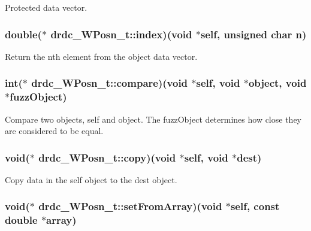 Protected data vector. 

\hypertarget{structdrdc__WPosn__t_fe7d9231dfd6645858e0427d49c78e2b}{
\subsubsection[index]{\setlength{\rightskip}{0pt plus 5cm}double($\ast$ {\bf drdc\_\-WPosn\_\-t::index})(void $\ast$self, unsigned char n)}}
\label{structdrdc__WPosn__t_fe7d9231dfd6645858e0427d49c78e2b}


Return the nth element from the object data vector. 

\hypertarget{structdrdc__WPosn__t_cd52c076640186112fd6f8a7bd6a626d}{
\subsubsection[compare]{\setlength{\rightskip}{0pt plus 5cm}int($\ast$ {\bf drdc\_\-WPosn\_\-t::compare})(void $\ast$self, void $\ast$object, void $\ast$fuzzObject)}}
\label{structdrdc__WPosn__t_cd52c076640186112fd6f8a7bd6a626d}


Compare two objects, self and object. The fuzzObject determines how close they are considered to be equal. 

\hypertarget{structdrdc__WPosn__t_82a7fe2ab8a4226c4676b10de72d82d8}{
\subsubsection[copy]{\setlength{\rightskip}{0pt plus 5cm}void($\ast$ {\bf drdc\_\-WPosn\_\-t::copy})(void $\ast$self, void $\ast$dest)}}
\label{structdrdc__WPosn__t_82a7fe2ab8a4226c4676b10de72d82d8}


Copy data in the self object to the dest object. 

\hypertarget{structdrdc__WPosn__t_9bcd805098f9465c01d2e718afb6c5b1}{
\subsubsection[setFromArray]{\setlength{\rightskip}{0pt plus 5cm}void($\ast$ {\bf drdc\_\-WPosn\_\-t::setFromArray})(void $\ast$self, const double $\ast$array)}}
\label{structdrdc__WPosn__t_9bcd805098f9465c01d2e718afb6c5b1}


